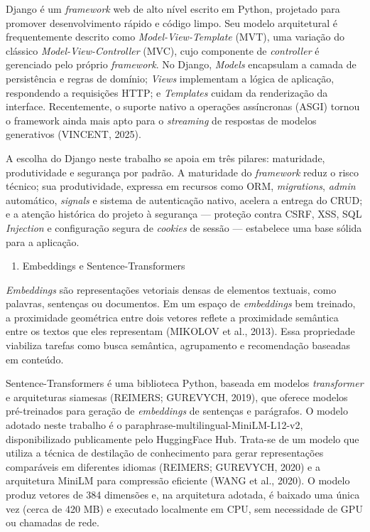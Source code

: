 \documentclass[
]{article}
\begin{document}
Django é um \emph{framework} web de alto nível escrito em Python,
projetado para promover desenvolvimento rápido e código limpo. Seu
modelo arquitetural é frequentemente descrito como
\emph{Model-View-Template} (MVT), uma variação do clássico
\emph{Model-View-Controller} (MVC), cujo componente de \emph{controller}
é gerenciado pelo próprio \emph{framework}. No Django, \emph{Models}
encapsulam a camada de persistência e regras de domínio; \emph{Views}
implementam a lógica de aplicação, respondendo a requisições HTTP; e
\emph{Templates} cuidam da renderização da interface. Recentemente, o
suporte nativo a operações assíncronas (ASGI) tornou o framework ainda
mais apto para o \emph{streaming} de respostas de modelos generativos
(VINCENT, 2025).

A escolha do Django neste trabalho se apoia em três pilares: maturidade,
produtividade e segurança por padrão. A maturidade do \emph{framework}
reduz o risco técnico; sua produtividade, expressa em recursos como ORM,
\emph{migrations}, \emph{admin} automático, \emph{signals} e sistema de
autenticação nativo, acelera a entrega do CRUD; e a atenção histórica do
projeto à segurança --- proteção contra CSRF, XSS, SQL \emph{Injection}
e configuração segura de \emph{cookies} de sessão --- estabelece uma
base sólida para a aplicação.

\begin{enumerate}
\def\labelenumi{\arabic{enumi}.}
\setcounter{enumi}{1}
\item
  \protect{}\label{_Toc230227811}{}Embeddings e
  Sentence-Transformers
\end{enumerate}

\emph{Embeddings} são representações vetoriais densas de elementos
textuais, como palavras, sentenças ou documentos. Em um espaço de
\emph{embeddings} bem treinado, a proximidade geométrica entre dois
vetores reflete a proximidade semântica entre os textos que eles
representam (MIKOLOV et al., 2013). Essa propriedade viabiliza tarefas
como busca semântica, agrupamento e recomendação baseadas em conteúdo.

Sentence-Transformers é uma biblioteca Python, baseada em modelos
\emph{transformer} e arquiteturas siamesas (REIMERS; GUREVYCH, 2019),
que oferece modelos pré-treinados para geração de \emph{embeddings} de
sentenças e parágrafos. O modelo adotado neste trabalho é o
paraphrase-multilingual-MiniLM-L12-v2, disponibilizado publicamente pelo
HuggingFace Hub. Trata-se de um modelo que utiliza a técnica de
destilação de conhecimento para gerar representações comparáveis em
diferentes idiomas (REIMERS; GUREVYCH, 2020) e a arquitetura MiniLM para
compressão eficiente (WANG et al., 2020). O modelo produz vetores de 384
dimensões e, na arquitetura adotada, é baixado uma única vez (cerca de
420 MB) e executado localmente em CPU, sem necessidade de GPU ou
chamadas de rede.
\end{document}
